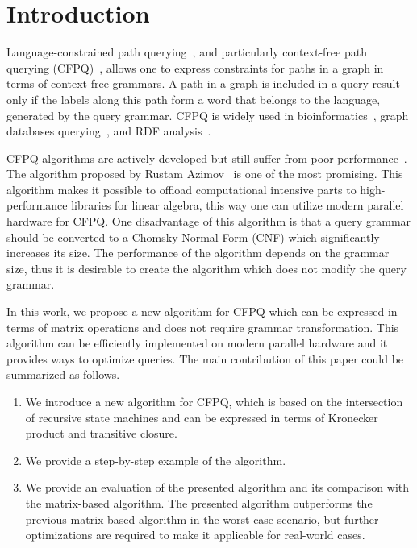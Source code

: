 \section{Introduction}

Language-constrained path querying~\cite{doi:10.1137/S0097539798337716}, and particularly context-free path querying (CFPQ)~\cite{Yannakakis}, allows one to express constraints for paths in a graph in terms of context-free grammars.
A path in a graph is included in a query result only if the labels along this path form a word that belongs to the language, generated by the query grammar.
CFPQ is widely used in bioinformatics~\cite{GraphQueryWithEarley}, graph databases querying~\cite{hellings2015querying,Medeiros:2018:EEC:3167132.3167265,10.1145/3335783.3335791}, and RDF analysis~\cite{RDF}.

CFPQ algorithms are actively developed but still suffer from poor performance~\cite{10.1145/3335783.3335791}.
The algorithm proposed by Rustam Azimov~\cite{Azimov:2018:CPQ:3210259.3210264} is one of the most promising.
This algorithm makes it possible to offload computational intensive parts to high-performance libraries for linear algebra, this way one can utilize modern parallel hardware for CFPQ.
One disadvantage of this algorithm is that a query grammar should be converted to a Chomsky Normal Form (CNF) which significantly increases its size.
The performance of the algorithm depends on the grammar size, thus it is desirable to create the algorithm which does not modify the query grammar.

In this work, we propose a new algorithm for CFPQ which can be expressed in terms of matrix operations and does not require grammar transformation.
This algorithm can be efficiently implemented on modern parallel hardware and it provides ways to optimize queries.
The main contribution of this paper could be summarized as follows.

\begin{enumerate}
\item We introduce a new algorithm for CFPQ, which is based on the intersection of recursive state machines and can be expressed in terms of Kronecker product and transitive closure.
\item We provide a step-by-step example of the algorithm.
\item We provide an evaluation of the presented algorithm and its comparison with the matrix-based algorithm.
The presented algorithm outperforms the previous matrix-based algorithm in the worst-case scenario, but further optimizations are required to make it applicable for real-world cases.
\end{enumerate}

